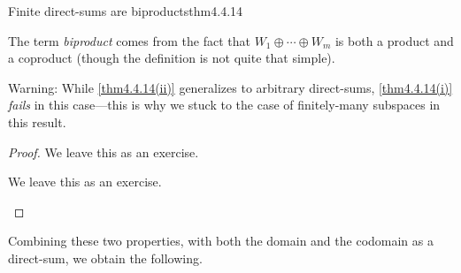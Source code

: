 \begin{thm}{Finite direct-sums are biproducts}{thm4.4.14}
\begin{rmk}
	\end{rmk}
	\begin{rmk}
		The term \emph{biproduct} comes from the fact that $W_1\oplus \cdots \oplus W_m$ is both a product and a coproduct (though the definition is not quite that simple).
	\end{rmk}
	\begin{rmk}
		Warning:  While \cref{thm4.4.14(ii)} generalizes to arbitrary direct-sums, \cref{thm4.4.14(i)} \emph{fails} in this case---this is why we stuck to the case of finitely-many subspaces in this result.
	\end{rmk}
	\begin{proof}
		We leave this as an exercise.
		\begin{exr}[breakable=false]{}{}
			We leave this as an exercise.
		\end{exr}
	\end{proof}
\end{thm}
Combining these two properties, with both the domain and the codomain as a direct-sum, we obtain the following.
